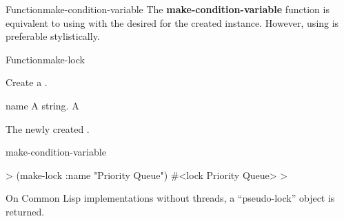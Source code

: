 \begin{functiondoc}{Function}{make-condition-variable}
\fnnote The \textbf{make-condition-variable} function is equivalent to using
 with the desired  for
the created  instance.  However, using
 is preferable stylistically.

\end{functiondoc}


\begin{functiondoc}{Function}{make-lock}{ 
    \returns{} } 
%
%
%

\fnsyntax

\fnpurpose Create a .

\fnpackage {}

\fnmodule {}

\fnargs
\begin{args}{name}
\arg[name] A string.
\arg[lock] A 
\end{args}

\fnreturns The newly created . 

\begin{alsos}{make-condition-variable}
\end{alsos}

\fnexample
%
\W\supp
\begin{example}
  > (make-lock :name "Priority Queue")
  #<lock Priority Queue>
  >
\end{example}

\fnnote On Common Lisp implementations without threads, a
``pseudo-lock'' object is returned.

\end{functiondoc}


